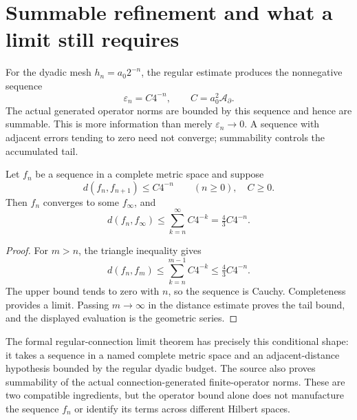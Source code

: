 


\section{Summable refinement and what a limit still requires}
\label{g:summable}
For the dyadic mesh $h_n=a_0 2^{-n}$, the regular estimate produces the nonnegative sequence
\[
 \varepsilon_n=C4^{-n},\qquad C=a_0^2\mathcal A_{\partial}.
\]
The actual generated operator norms are bounded by this sequence and hence are summable. This is more information than merely $\varepsilon_n\to0$. A sequence with adjacent errors tending to zero need not converge; summability controls the accumulated tail.

\begin{proposition}
Let $f_n$ be a sequence in a complete metric space and suppose
\[
 d(f_n,f_{n+1})\leq C4^{-n}\qquad(n\geq0),\quad C\geq0.
\]
Then $f_n$ converges to some $f_\infty$, and
\begin{equation}
 d(f_n,f_\infty)\leq\sum_{k=n}^{\infty}C4^{-k}
 =\tfrac43C4^{-n}.
 \label{g:dyadic-tail}
\end{equation}
\end{proposition}
\begin{proof}
For $m>n$, the triangle inequality gives
\[
 d(f_n,f_m)\leq\sum_{k=n}^{m-1}C4^{-k}
 \leq\tfrac43C4^{-n}.
\]
The upper bound tends to zero with $n$, so the sequence is Cauchy. Completeness provides a limit. Passing $m\to\infty$ in the distance estimate proves the tail bound, and the displayed evaluation is the geometric series.
\end{proof}

The formal regular-connection limit theorem has precisely this conditional shape: it takes a sequence in a named complete metric space and an adjacent-distance hypothesis bounded by the regular dyadic budget. The source also proves summability of the actual connection-generated finite-operator norms. These are two compatible ingredients, but the operator bound alone does not manufacture the sequence $f_n$ or identify its terms across different Hilbert spaces.

